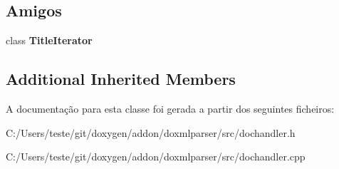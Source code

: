 \subsection*{Amigos}
\begin{DoxyCompactItemize}
\item 
\hypertarget{class_title_handler_a6bb9587c08cb027d17f079c06df0f347}{class {\bfseries Title\-Iterator}}\label{class_title_handler_a6bb9587c08cb027d17f079c06df0f347}

\end{DoxyCompactItemize}
\subsection*{Additional Inherited Members}


A documentação para esta classe foi gerada a partir dos seguintes ficheiros\-:\begin{DoxyCompactItemize}
\item 
C\-:/\-Users/teste/git/doxygen/addon/doxmlparser/src/dochandler.\-h\item 
C\-:/\-Users/teste/git/doxygen/addon/doxmlparser/src/dochandler.\-cpp\end{DoxyCompactItemize}
